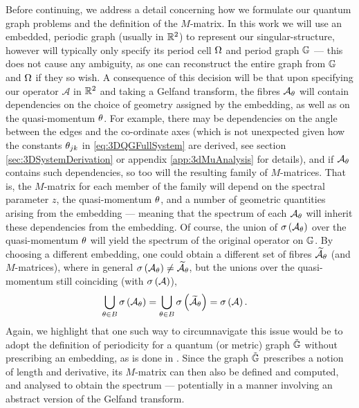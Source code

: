 Before continuing, we address a detail concerning how we formulate our quantum graph problems and the definition of the $M$-matrix.
In this work we will use an embedded, periodic graph (usually in $\mathbb{R}^2$) to represent our singular-structure, however will typically only specify its period cell $\Omega$ and period graph $\mathbb{G}$ --- this does not cause any ambiguity, as one can reconstruct the entire graph from $\mathbb{G}$ and $\Omega$ if they so wish.
A consequence of this decision will be that upon specifying our operator $\mathcal{A}$ in $\mathbb{R}^2$ and taking a Gelfand transform, the fibres $\mathcal{A}_{\theta}$ will contain dependencies on the choice of geometry assigned by the embedding, as well as on the quasi-momentum $\theta$.
For example, there may be dependencies on the angle between the edges and the co-ordinate axes (which is not unexpected given how the constants $\theta_{jk}$ in \eqref{eq:3DQGFullSystem} are derived, see section \ref{sec:3DSystemDerivation} or appendix \ref{app:3dMuAnalysis} for details), and if $\mathcal{A}_{\theta}$ contains such dependencies, so too will the resulting family of $M$-matrices.
That is, the $M$-matrix for each member of the family will depend on the spectral parameter $z$, the quasi-momentum $\theta$, and a number of geometric quantities arising from the embedding --- meaning that the spectrum of each $\mathcal{A}_{\theta}$ will inherit these dependencies from the embedding.
Of course, the union of $\sigma\left( \mathcal{A}_{\theta} \right)$ over the quasi-momentum $\theta$ will yield the spectrum of the original operator on $\mathbb{G}$.
By choosing a different embedding, one could obtain a different set of fibres $\widetilde{\mathcal{A}}_{\theta}$ (and $M$-matrices), where in general $\sigma\left( \mathcal{A}_{\theta} \right) \neq \widetilde{\mathcal{A}}_{\theta}$, but the unions over the quasi-momentum still coinciding (with $\sigma\left( \mathcal{A} \right)$),
\begin{align*}
	\bigcup_{\theta\in B} \sigma\left( \mathcal{A}_{\theta} \right) &= \bigcup_{\theta\in B} \sigma\left( \widetilde{\mathcal{A}}_{\theta} \right) = \sigma\left( \mathcal{A} \right).
\end{align*}
Again, we highlight that one such way to circumnavigate this issue would be to adopt the definition of periodicity for a quantum (or metric) graph $\tilde{\mathbb{G}}$ without prescribing an embedding, as is done in \cite[Chapter~4]{berkolaiko2013introduction}.
Since the graph $\tilde{\mathbb{G}}$ prescribes a notion of length and derivative, its $M$-matrix can then also be defined and computed, and analysed to obtain the spectrum --- potentially in a manner involving an abstract version of the Gelfand transform.
